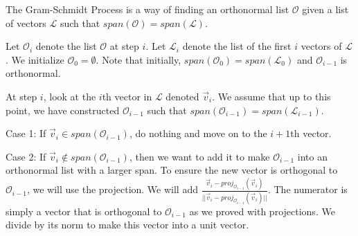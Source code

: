 \begin{definition}
    The Gram-Schmidt Process is a way of finding an orthonormal list $\mathcal{O}$ given a list of vectors $\mathcal{L}$ such that $span(\mathcal{O})=span(\mathcal{L})$.

    Let $\mathcal{O}_i$ denote the list $\mathcal{O}$ at step $i$. Let $\mathcal{L}_i$ denote the list of the first $i$ vectors of $\mathcal{L}$. We initialize $\mathcal{O}_0=\emptyset$. Note that initially, $span(\mathcal{O}_0)=span(\mathcal{L}_0)$ and $\mathcal{O}_{i-1}$ is orthonormal.

    At step $i$, look at the $i$th vector in $\mathcal{L}$ denoted $\vec{v}_i$. We assume that up to this point, we have constructed $\mathcal{O}_{i-1}$ such that $span(\mathcal{O}_{i-1})=span(\mathcal{L}_{i-1})$.

    Case 1: If $\vec{v}_i\in span(\mathcal{O}_{i-1})$, do nothing and move on to the $i+1$th vector.

    Case 2: If $\vec{v}_i\notin span(\mathcal{O}_{i-1})$, then we want to add it to make $\mathcal{O}_{i-1}$ into an orthonormal list with a larger span. To ensure the new vector is orthogonal to $\mathcal{O}_{i-1}$, we will use the projection. We will add $\frac{\vec{v}_i-proj_{\mathcal{O}_{i-1}}(\vec{v}_i)}{||\vec{v}_i-proj_{\mathcal{O}_{i-1}}(\vec{v}_i)||}$. The numerator is simply a vector that is orthogonal to $\mathcal{O}_{i-1}$ as we proved with projections. We divide by its norm to make this vector into a unit vector.
\end{definition}

